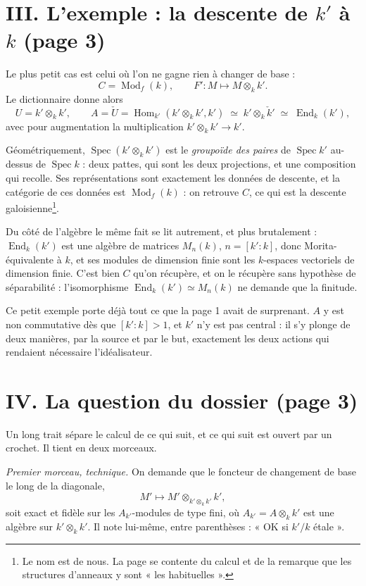 \documentclass[11pt,a4paper]{article}
\begin{document}
\section*{III. L'exemple : la descente de $k'$ à $k$ (page 3)}

Le plus petit cas est celui où l'on ne gagne rien à changer de base :
\[
C = \operatorname{Mod}_{f}(k),
\qquad
F' : M \longmapsto M \otimes_{k} k'.
\]
Le dictionnaire donne alors
\[
U = k' \otimes_{k} k',
\qquad
A = \check{U} = \operatorname{Hom}_{k'}(k' \otimes_{k} k', k')
\;\simeq\; k' \otimes_{k} \check{k}'
\;\simeq\; \operatorname{End}_{k}(k'),
\]
avec pour augmentation la multiplication $k' \otimes_{k} k' \to k'$.

Géométriquement, $\operatorname{Spec}(k' \otimes_{k} k')$ est le
\emph{groupoïde des paires} de $\operatorname{Spec} k'$ au-dessus de
$\operatorname{Spec} k$ : deux pattes, qui sont les deux projections, et une
composition qui recolle. Ses représentations sont exactement les données de
descente, et la catégorie de ces données est $\operatorname{Mod}_{f}(k)$ : on
retrouve $C$, ce qui est la descente galoisienne\footnote{Le nom est de nous.
La page se contente du calcul et de la remarque que les structures d'anneaux y
sont « les habituelles ».}.

Du côté de l'algèbre le même fait se lit autrement, et plus brutalement :
$\operatorname{End}_{k}(k')$ est une algèbre de matrices $M_{n}(k)$,
$n = [k' : k]$, donc Morita-équivalente à $k$, et ses modules de dimension
finie sont les $k$-espaces vectoriels de dimension finie. C'est bien $C$ qu'on
récupère, et on le récupère sans hypothèse de séparabilité : l'isomorphisme
$\operatorname{End}_{k}(k') \simeq M_{n}(k)$ ne demande que la finitude.

Ce petit exemple porte déjà tout ce que la page 1 avait de surprenant. $A$ y
est non commutative dès que $[k':k] > 1$, et $k'$ n'y est pas central : il s'y
plonge de deux manières, par la source et par le but, exactement les deux
actions qui rendaient nécessaire l'idéalisateur.

\section*{IV. La question du dossier (page 3)}

Un long trait sépare le calcul de ce qui suit, et ce qui suit est ouvert par un
crochet. Il tient en deux morceaux.

\emph{Premier morceau, technique.} On demande que le foncteur de changement de
base le long de la diagonale,
\[
M' \longmapsto M' \otimes_{k' \otimes_{k} k'} k',
\]
soit exact et fidèle sur les $A_{k'}$-modules de type fini, où
$A_{k'} = A \otimes_{k} k'$ est une algèbre sur $k' \otimes_{k} k'$. Il note
lui-même, entre parenthèses : « OK si $k'/k$ étale ».
\end{document}
